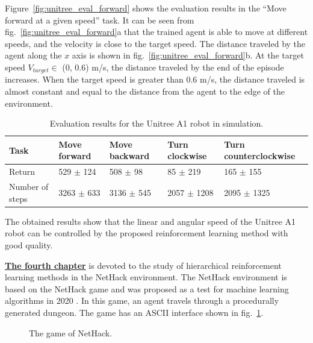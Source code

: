 Figure~\ref{fig:unitree_eval_forward} shows the evaluation results in the ``Move forward at a given speed'' task. It can be seen from fig.~\ref{fig:unitree_eval_forward}a that the trained agent is able to move at different speeds, and the velocity is close to the target speed. The distance traveled by the agent along the $x$ axis is shown in fig.~\ref{fig:unitree_eval_forward}b. At the target speed $V_{target} \in$ (0, 0.6) m/s, the distance traveled by the end of the episode increases. When the target speed is greater than 0.6 m/s, the distance traveled is almost constant and equal to the distance from the agent to the edge of the environment.

\begin{table} [htbp]
    \centering
    \begin{threeparttable}
        \caption{Evaluation results for the Unitree A1 robot in simulation.}\label{tab:unitree_eval}
        \begin{tabular}{| p{2cm} || p{2cm} | p{2cm} | p{2cm} |p{2.5cm} |}
            \hline
            \hline
            Task & Move forward & Move backward & Turn clockwise & Turn counterclockwise \\
            \hline
            Return &	529 $\pm$ 124 &	508 $\pm$ 98 &	85 $\pm$ 219 &	165 $\pm$ 155 \\
            Number of steps & 3263 $\pm$ 633 &	3136 $\pm$ 545 &	2057 $\pm$ 1208 &	2095 $\pm$ 1325 \\
            \hline
            \hline
        \end{tabular}
    \end{threeparttable}
\end{table}

The obtained results show that the linear and angular speed of the Unitree A1 robot can be controlled by the proposed reinforcement learning method with good quality.

\underline{\textbf{The fourth chapter}} is devoted to the study of hierarchical reinforcement learning methods in the NetHack environment. The NetHack environment is based on the NetHack game and was proposed as a test for machine learning algorithms in 2020 \cite{nethack}. In this game, an agent travels through a procedurally generated dungeon. The game has an ASCII interface shown in fig.~\ref{fig:nethack}.

\begin{figure}[ht]
    \caption{The game of NetHack.}\label{fig:nethack}
\end{figure}

